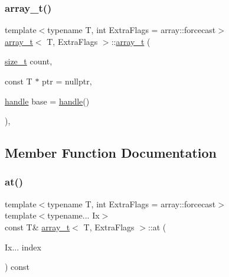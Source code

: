 \mbox{\label{classarray__t_a130630a78f09e64673c5524ded69a368}} 
\subsubsection{\texorpdfstring{array\_t()}{array\_t()}\hspace{0.1cm}{\footnotesize\ttfamily [9/9]}}
{\footnotesize\ttfamily template$<$typename T, int Extra\+Flags = array\+::forcecast$>$ \\
\mbox{\hyperlink{classarray__t}{array\+\_\+t}}$<$ T, Extra\+Flags $>$\+::\mbox{\hyperlink{classarray__t}{array\+\_\+t}} (\begin{DoxyParamCaption}\item[{\mbox{\hyperlink{detail_2common_8h_a801d6a451a01953ef8cbae6feb6a3638}{size\+\_\+t}}}]{count,  }\item[{const T $\ast$}]{ptr = {\ttfamily nullptr},  }\item[{\mbox{\hyperlink{classhandle}{handle}}}]{base = {\ttfamily \mbox{\hyperlink{classhandle}{handle}}()} }\end{DoxyParamCaption})\hspace{0.3cm}{\ttfamily [inline]}, {\ttfamily [explicit]}}



\subsection{Member Function Documentation}
\mbox{\label{classarray__t_af237ba43b0ef8a7614f31c40ab1fc3e7}} 
\subsubsection{\texorpdfstring{at()}{at()}}
{\footnotesize\ttfamily template$<$typename T, int Extra\+Flags = array\+::forcecast$>$ \\
template$<$typename... Ix$>$ \\
const T\& \mbox{\hyperlink{classarray__t}{array\+\_\+t}}$<$ T, Extra\+Flags $>$\+::at (\begin{DoxyParamCaption}\item[{Ix...}]{index }\end{DoxyParamCaption}) const\hspace{0.3cm}{\ttfamily [inline]}}

